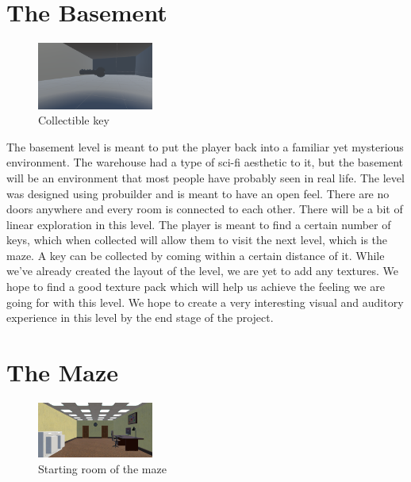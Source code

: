 \documentclass{vgtc}                          %
\begin{document}
\section{The Basement}

\begin{figure}[htb]
  \centering
  \includegraphics[width=1.5in]{key.png}
  \caption{Collectible key}
\end{figure}

The basement level is meant to put the player back into a familiar yet mysterious environment. The warehouse had a type of sci-fi aesthetic to it, but the basement will be an environment that most people have probably seen in real life. The level was designed using probuilder and is meant to have an open feel. There are no doors anywhere and every room is connected to each other. There will be a bit of linear exploration in this level. The player is meant to find a certain number of keys, which when collected will allow them to visit the next level, which is the maze. A key can be collected by coming within a certain distance of it. While we’ve already created the layout of the level, we are yet to add any textures. We hope to find a good texture pack which will help us achieve the feeling we are going for with this level. We hope to create a very interesting visual and auditory experience in this level by the end stage of the project. 

\section{The Maze}

\begin{figure}[htb]
  \centering
  \includegraphics[width=1.5in]{The Maze.png}
  \caption{Starting room of the maze}
\end{figure}
\end{document}

